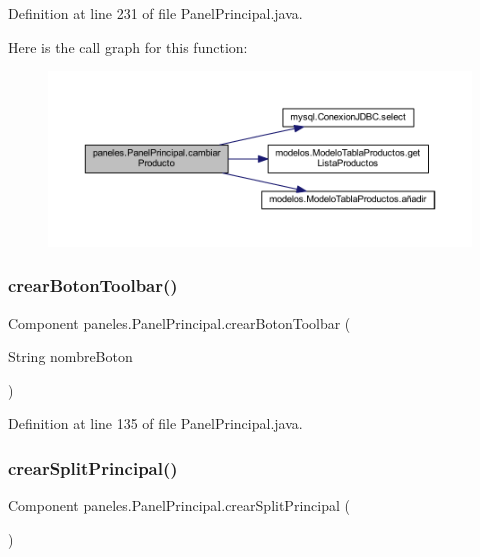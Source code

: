 Definition at line 231 of file Panel\+Principal.\+java.

Here is the call graph for this function\+:
\nopagebreak
\begin{figure}[H]
\begin{center}
\leavevmode
\includegraphics[width=350pt]{classpaneles_1_1_panel_principal_aa2151461e479985277d05375c02b1022_cgraph}
\end{center}
\end{figure}
\mbox{\label{classpaneles_1_1_panel_principal_a45d159d89db6217a595c166bf2f0b2ea}} 
\subsubsection{\texorpdfstring{crear\+Boton\+Toolbar()}{crearBotonToolbar()}}
{\footnotesize\ttfamily Component paneles.\+Panel\+Principal.\+crear\+Boton\+Toolbar (\begin{DoxyParamCaption}\item[{String}]{nombre\+Boton }\end{DoxyParamCaption})}



Definition at line 135 of file Panel\+Principal.\+java.

\mbox{\label{classpaneles_1_1_panel_principal_abf6e9ec8437453a751ea1a4bcc33fb87}} 
\subsubsection{\texorpdfstring{crear\+Split\+Principal()}{crearSplitPrincipal()}}
{\footnotesize\ttfamily Component paneles.\+Panel\+Principal.\+crear\+Split\+Principal (\begin{DoxyParamCaption}{ }\end{DoxyParamCaption})}



